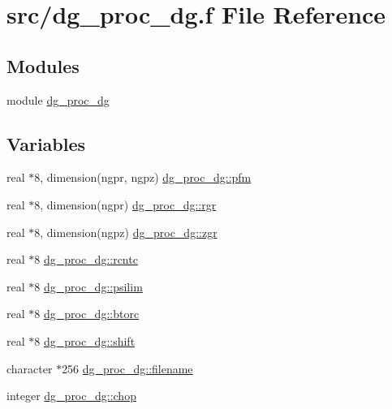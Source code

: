 \hypertarget{dg__proc__dg_8f}{
\section{src/dg\_\-proc\_\-dg.f File Reference}
\label{dg__proc__dg_8f}
}
\subsection*{Modules}
\begin{CompactItemize}
\item 
module \hyperlink{namespacedg__proc__dg}{dg\_\-proc\_\-dg}
\end{CompactItemize}
\subsection*{Variables}
\begin{CompactItemize}
\item 
real $\ast$8, dimension(ngpr, ngpz) \hyperlink{namespacedg__proc__dg_34d4b6308d30eeff40494270ca3e41dd}{dg\_\-proc\_\-dg::pfm}
\item 
real $\ast$8, dimension(ngpr) \hyperlink{namespacedg__proc__dg_37701a396c79a6a032240cbce2a97e69}{dg\_\-proc\_\-dg::rgr}
\item 
real $\ast$8, dimension(ngpz) \hyperlink{namespacedg__proc__dg_6664346fe46f234f41c923f7d8710b09}{dg\_\-proc\_\-dg::zgr}
\item 
real $\ast$8 \hyperlink{namespacedg__proc__dg_a41e0e0e8c2ba411d2b43e2265775189}{dg\_\-proc\_\-dg::rcntc}
\item 
real $\ast$8 \hyperlink{namespacedg__proc__dg_5107aa7a882e962895ad0db819eac7f9}{dg\_\-proc\_\-dg::psilim}
\item 
real $\ast$8 \hyperlink{namespacedg__proc__dg_4858e0f24b3a2b945edb969aa3397018}{dg\_\-proc\_\-dg::btorc}
\item 
real $\ast$8 \hyperlink{namespacedg__proc__dg_5b2c26eb45e5141de307ba77ec9b63f7}{dg\_\-proc\_\-dg::shift}
\item 
character $\ast$256 \hyperlink{namespacedg__proc__dg_afbcde755b792e734f84703b785a4725}{dg\_\-proc\_\-dg::filename}
\item 
integer \hyperlink{namespacedg__proc__dg_db49100523d7293683f277516929fea3}{dg\_\-proc\_\-dg::chop}
\end{CompactItemize}
